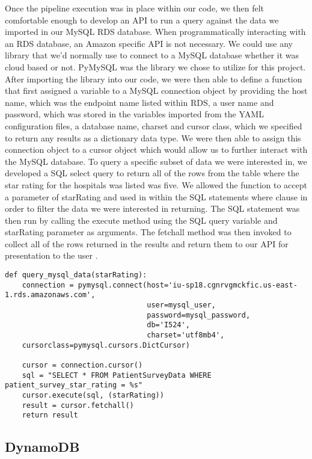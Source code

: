 Once the pipeline execution was in place within our code, we then felt 
comfortable enough to develop an API to run a query against the data we 
imported in our MySQL RDS database. When programmatically interacting with an 
RDS database, an Amazon specific API is not necessary. We could use any 
library that we'd normally use to connect to a MySQL database whether it was 
cloud based or not. PyMySQL was the library we chose to utilize for this 
project. After importing the library into our code, we were then able to 
define a function that first assigned a variable to a MySQL connection object 
by providing the host name, which was the endpoint name listed within RDS, a 
user name and password, which was stored in the variables imported from the 
YAML configuration files, a database name, charset and cursor class, which we 
specified to return any results as a dictionary data type. We were then able 
to assign this connection object to a cursor object which would allow us to 
further interact with the MySQL database. To query a specific subset of data 
we were interested in, we developed a SQL select query to return all of the 
rows from the table where the star rating for the hospitals was listed was 
five. We allowed the function to accept a parameter of starRating and used in 
within the SQL statements where clause in order to filter the data we were 
interested in returning. The SQL statement was then run by calling the execute 
method using the SQL query variable and starRating parameter as arguments. 
The fetchall method was then invoked to collect all of the rows returned in 
the results and return them to our API for presentation to the 
user \cite{hid-sp18-521-pymysql}. 

\begin{verbatim}
def query_mysql_data(starRating):
    connection = pymysql.connect(host='iu-sp18.cgnrvgmckfic.us-east-1.rds.amazonaws.com',
                                 user=mysql_user,
                                 password=mysql_password,
                                 db='I524',
                                 charset='utf8mb4',
    cursorclass=pymysql.cursors.DictCursor)

    cursor = connection.cursor()
    sql = "SELECT * FROM PatientSurveyData WHERE patient_survey_star_rating = %s"
    cursor.execute(sql, (starRating))
    result = cursor.fetchall()
    return result
\end{verbatim}

\subsection{DynamoDB}


